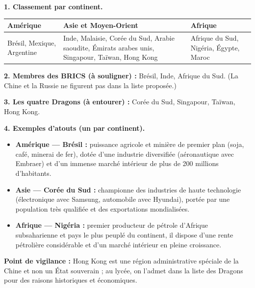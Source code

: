 \documentclass[11pt]{article}
\begin{document}
\begin{corrige}
\textbf{1. Classement par continent.}

\begin{center}
\begin{tabularx}{\linewidth}{|X|X|X|}\hline
\rowcolor{popblueL} \textbf{Amérique} & \textbf{Asie et Moyen-Orient} & \textbf{Afrique} \\ \hline
Brésil, Mexique, Argentine & Inde, Malaisie, Corée du Sud, Arabie saoudite, Émirats arabes unis, Singapour, Taïwan, Hong Kong & Afrique du Sud, Nigéria, Égypte, Maroc \\ \hline
\end{tabularx}
\end{center}

\textbf{2. Membres des BRICS (à souligner) :} Brésil, Inde, Afrique du Sud. (La Chine et la Russie ne figurent pas dans la liste proposée.)

\textbf{3. Les quatre Dragons (à entourer) :} Corée du Sud, Singapour, Taïwan, Hong Kong.

\textbf{4. Exemples d'atouts (un par continent).}
\begin{itemize}
\item \textbf{Amérique — Brésil :} puissance agricole et minière de premier plan (soja, café, minerai de fer), dotée d'une industrie diversifiée (aéronautique avec Embraer) et d'un immense marché intérieur de plus de 200 millions d'habitants.
\item \textbf{Asie — Corée du Sud :} championne des industries de haute technologie (électronique avec Samsung, automobile avec Hyundai), portée par une population très qualifiée et des exportations mondialisées.
\item \textbf{Afrique — Nigéria :} premier producteur de pétrole d'Afrique subsaharienne et pays le plus peuplé du continent, il dispose d'une rente pétrolière considérable et d'un marché intérieur en pleine croissance.
\end{itemize}

\textbf{Point de vigilance :} Hong Kong est une région administrative spéciale de la Chine et non un État souverain ; au lycée, on l'admet dans la liste des Dragons pour des raisons historiques et économiques.
\end{corrige}
\end{document}
